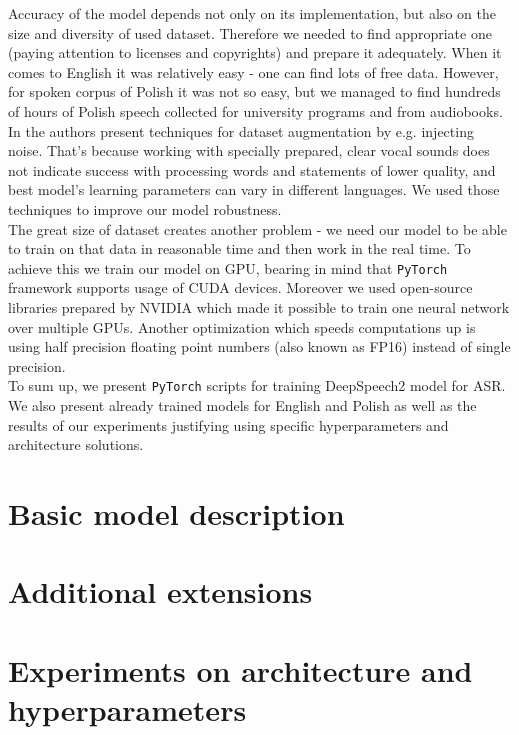 ﻿\documentclass[11pt,a4paper]{article}
\begin{document}
Accuracy of the model depends not only on its implementation, but also on the size and diversity of used dataset. Therefore we needed to find appropriate one (paying attention to licenses and copyrights) and prepare it adequately. When it comes to English it was relatively easy - one can find lots of free data. However, for spoken corpus of Polish it was not so easy, but we managed to find hundreds of hours of Polish speech collected for university programs and from audiobooks. In \cite{DS1} the authors present techniques for dataset augmentation by e.g. injecting noise. That's because working with specially prepared, clear vocal sounds does not indicate success with processing words and statements of lower quality, and best model's learning parameters can vary in different languages. We used those techniques to improve our model robustness.\\

The great size of dataset creates another problem - we need our model to be able to train on that data in reasonable time and then work in the real time. To achieve this we train our model on GPU, bearing in mind that \texttt{PyTorch} framework supports usage of CUDA devices. Moreover we used open-source libraries prepared by NVIDIA which made it possible to train one neural network over multiple GPUs. Another optimization which speeds computations up is using half precision floating point numbers (also known as FP16) instead of single precision. \\

To sum up, we present \texttt{PyTorch} scripts for training DeepSpeech2 model for ASR. We also present already trained models for English and Polish as well as the results of our experiments justifying using specific hyperparameters and architecture solutions.\\

\newpage
\section{Basic model description}

\newpage
\section{Additional extensions}

\newpage
\section{Experiments on architecture and hyperparameters}
\end{document}
